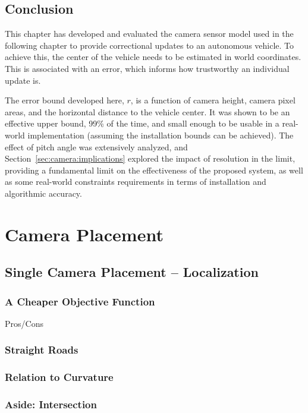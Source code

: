 \documentclass[a4paper,12pt,twoside,openright]{report}
\begin{document}
\section{Conclusion}

This chapter has developed and evaluated the camera sensor model
used in the following chapter to provide correctional updates
to an autonomous vehicle. To achieve this, the center
of the vehicle needs to be estimated in world coordinates. This
is associated with an error, which informs how trustworthy
an individual update is.

The error bound developed here, $r$, is a function of camera height,
camera pixel areas, and the horizontal distance to the vehicle center.
It was shown to be an effective upper bound, 99\% of the time, and
small enough to be usable in a real-world implementation (assuming
the installation bounds can be achieved). The effect of pitch angle
was extensively analyzed, and Section~\ref{sec:camera:implications}
explored the impact of resolution in the limit, providing a 
fundamental limit on the effectiveness of the proposed system,
as well as some real-world constraints requirements in terms of
installation and algorithmic accuracy.


\chapter{Camera Placement}
\label{chap:cameraplacement}


\section{Single Camera Placement -- Localization}

\subsection{A Cheaper Objective Function}
Pros/Cons

\subsection{Straight Roads}

\subsection{Relation to Curvature}

\subsection{Aside: Intersection}
\end{document}
